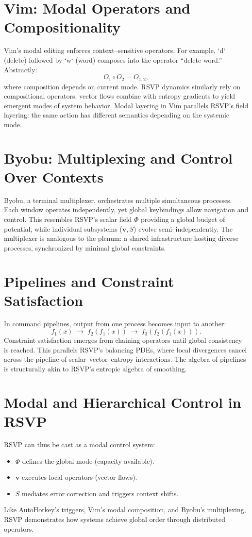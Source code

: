 \documentclass[a4paper,11pt,openany]{book}
\begin{document}
\section{Vim: Modal Operators and Compositionality}

Vim’s modal editing enforces context–sensitive operators. For example, `d` (delete) followed 
by `w` (word) composes into the operator “delete word.” Abstractly:
\[
O_1 \circ O_2 = O_{1,2},
\]
where composition depends on current mode. RSVP dynamics similarly rely on compositional 
operators: vector flows combine with entropy gradients to yield emergent modes of system 
behavior. Modal layering in Vim parallels RSVP’s field layering: the same action has 
different semantics depending on the systemic mode.  

\section{Byobu: Multiplexing and Control Over Contexts}

Byobu, a terminal multiplexer, orchestrates multiple simultaneous processes. Each window 
operates independently, yet global keybindings allow navigation and control. This resembles 
RSVP’s scalar field $\Phi$ providing a global budget of potential, while individual 
subsystems ($\mathbf{v}, S$) evolve semi–independently. The multiplexer is analogous to the 
plenum: a shared infrastructure hosting diverse processes, synchronized by minimal global 
constraints.  

\section{Pipelines and Constraint Satisfaction}

In command pipelines, output from one process becomes input to another:
\[
f_1(x) \;\to\; f_2(f_1(x)) \;\to\; f_3(f_2(f_1(x))).
\]
Constraint satisfaction emerges from chaining operators until global consistency is reached. 
This parallels RSVP’s balancing PDEs, where local divergences cancel across the pipeline of 
scalar–vector–entropy interactions. The algebra of pipelines is structurally akin to RSVP’s 
entropic algebra of smoothing.  

\section{Modal and Hierarchical Control in RSVP}

RSVP can thus be cast as a modal control system:
\begin{itemize}
  \item $\Phi$ defines the global mode (capacity available).
  \item $\mathbf{v}$ executes local operators (vector flows).
  \item $S$ mediates error correction and triggers context shifts.
\end{itemize}
Like AutoHotkey’s triggers, Vim’s modal composition, and Byobu’s multiplexing, RSVP 
demonstrates how systems achieve global order through distributed operators.  
\end{document}
